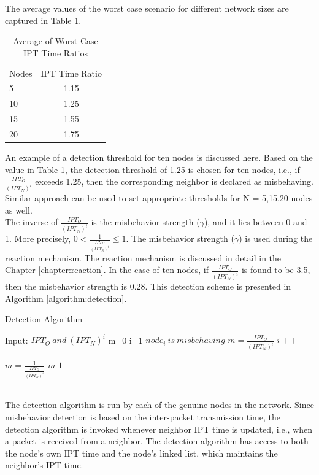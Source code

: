 \documentclass[12pt,letterpaper,english]{article}
\begin{document}
The average values of the worst case scenario for different network sizes are captured in Table \ref{table:averageworstcase}. 
\begin{table}[H]
\caption{Average of Worst Case IPT Time Ratios}
\label{table:averageworstcase}
\begin{center}
\begin{tabular}{l c}
\hline
\hline
Nodes & IPT Time Ratio\\
5 & 1.15\\
10 & 1.25\\
15 & 1.55\\
20 & 1.75\\
\hline
\end{tabular}
\end{center}
\end{table}
An example of a detection threshold for ten nodes is discussed here.
Based on the value in Table \ref{table:averageworstcase}, the detection threshold of 1.25 is chosen for ten nodes, i.e., if $\frac{IPT_O}{(IPT_N)^i}$ exceeds 1.25, then the corresponding neighbor is declared as misbehaving. Similar approach can be used to set appropriate thresholds for N = {5,15,20} nodes as well. 
\\
\indent The inverse of $\frac{IPT_O}{(IPT_N)^i}$ is the misbehavior strength ($\gamma$), and it lies between 0 and 1. More precisely, $0 < \frac{1}{\frac{IPT_O}{(IPT_N)^i}} \leq 1$. The misbehavior strength ($\gamma$) is used during the reaction mechanism. The reaction mechanism is discussed in detail in the Chapter \ref{chapter:reaction}. In the case of ten nodes, if $\frac{IPT_O}{(IPT_N)^i}$ is found to be 3.5, then the misbehavior strength is $0.28$. This detection scheme is presented in Algorithm \ref{algorithm:detection}.
\begin{algorithm}
\caption{Detection Algorithm}
\label{algorithm:detection}
\begin{algorithmic}
\STATE Input: $IPT_O\ and\ (IPT_N)^i$
\STATE m=0
\STATE i=1
        \STATE $node_{i}\ is\ misbehaving$
        	\STATE $m = \frac{IPT_O}{(IPT_N)^i}$
        \ENDIF
	\ENDIF
	\STATE $i++$
\ENDWHILE

	\STATE $m = \frac{1}{\frac{IPT_O}{(IPT_N)^i}}$
	\RETURN $m$
\ELSE
	\RETURN $1$
\ENDIF
\end{algorithmic}
\end{algorithm}
\\
\indent The detection algorithm is run by each of the genuine nodes in the network. Since misbehavior detection is based on the inter-packet transmission time, the detection algorithm is invoked whenever neighbor IPT time is updated, i.e., when a packet is received from a neighbor. The detection algorithm has access to both the node's own IPT time and the node's linked list, which maintains the neighbor's IPT time.
\end{document}
